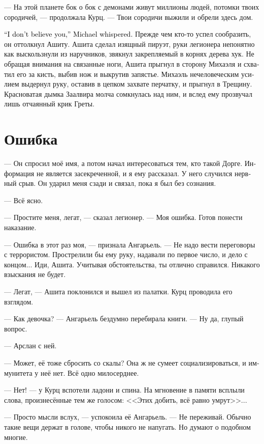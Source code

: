\documentclass[a4paper,12pt,fleqn]{book}\usepackage{cooltooltips}\usepackage{polyglossia}\setdefaultlanguage[babelshorthands=true]{russian}\setotherlanguage{english}\defaultfontfeatures{Ligatures=TeX,Mapping=tex-text} \usepackage{xcolor}\definecolor{lightgray}{HTML}{bbbbbb}\color{lightgray}\newcommand{\ml}[3]{\textenglish{\textcolor{black}{#3}}}
\begin{document}
--- На этой планете бок о бок с демонами живут миллионы людей, потомки твоих сородичей, --- продолжала Курц.
--- Твои сородичи выжили и обрели здесь дом.

\ml{$0$}
{--- Я тебе не верю, --- прошептал Михаэль.}
{``I don't believe you,'' Michael whispered.}
Прежде чем кто-то успел сообразить, он оттолкнул Ашиту.
Ашита сделал изящный пируэт, руки легионера непонятно как выскользнули из наручников, звякнул закрепляемый в корнях дерева хук.
Не обращая внимания на связанные ноги, Ашита прыгнул в сторону Михаэля и схватил его за кисть, выбив нож и выкрутив запястье.
Михаэль нечеловеческим усилием выдернул руку, оставив в цепком захвате перчатку, и прыгнул в Трещину.
Красноватая дымка Заалвира молча сомкнулась над ним, и вслед ему прозвучал лишь отчаянный крик Греты.

\section{Ошибка}

--- Он спросил моё имя, а потом начал интересоваться тем, кто такой Дорге.
Информация не является засекреченной, и я ему рассказал.
У него случился нервный срыв.
Он ударил меня сзади и связал, пока я был без сознания.

--- Всё ясно.

--- Простите меня, легат, --- сказал легионер.
--- Моя ошибка.
Готов понести наказание.

--- Ошибка в этот раз моя, --- признала Ангарьель.
--- Не надо вести переговоры с террористом.
Прострелили бы ему руку, надавали по первое число, и дело с концом...
Иди, Ашита.
Учитывая обстоятельства, ты отлично справился.
Никакого взыскания не будет.

--- Легат, --- Ашита поклонился и вышел из палатки.
Курц проводила его взглядом.

--- Как девочка? --- Ангарьель бездумно перебирала книги.
--- Ну да, глупый вопрос.

--- Арслан с ней.

--- Может, её тоже сбросить со скалы?
Она ж не сумеет социализироваться, и иммунитета у неё нет.
Всё одно милосерднее.

--- Нет! --- у Курц вспотели ладони и спина.
На мгновение в памяти всплыли слова, произнесённые тем же голосом:
<<Этих добить, всё равно умрут>>...

--- Просто мысли вслух, --- успокоила её Ангарьель.
--- Не переживай.
Обычно такие вещи держат в голове, чтобы никого не напугать.
Но думают о подобном многие.
\end{document}

